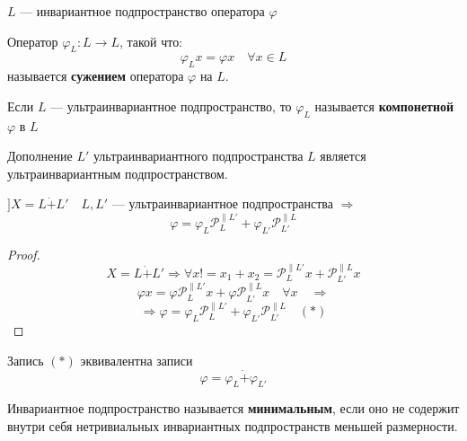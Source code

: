 $L$ --- инвариантное подпространство оператора $\varphi$

\begin{definition}
    Оператор $\varphi_L : L\to L$, такой что:
    $$\varphi_L x =\varphi x \quad \forall x\in L$$
    называется \textbf{сужением} оператора $\varphi$ на $L$.

    Если $L$ --- ультраинвариантное подпространство, то $\varphi_L$ называется \textbf{компонетной} $\varphi$ в $L$ 
\end{definition}

\begin{lemma}
    Дополнение $L'$ ультраинвариантного подпространства $L$ является ультраинвариантным подпространством.
\end{lemma}
\begin{lemma}
    $] X = L \dot+ L' \quad L,L'$ --- ультраинвариантное подпространства $\Rightarrow$
    $$\varphi = \varphi_L \mathcal P_L^{\parallel L'} + \varphi_{L'} \mathcal P_{L'}^{\parallel L}$$
\end{lemma}
\begin{proof}
    $$X = L \dot+ L' \Rightarrow \forall x! = x_1+x_2 = \mathcal P_L^{\parallel L'} x + \mathcal P_{L'}^{\parallel L} x$$
    $$\varphi x = \varphi \mathcal P_L^{\parallel L'} x + \varphi \mathcal P_{L'}^{\parallel L} x \quad \forall x \quad \Rightarrow$$
    $$\Rightarrow \varphi=\varphi_L \mathcal P_L^{\parallel L'} + \varphi_{L'} \mathcal P_{L'}^{\parallel L} \quad (*)$$
\end{proof}

\begin{remark}
    Запись $(*)$ эквивалентна записи
    $$\varphi = \varphi_L \dot+ \varphi_{L'}$$
\end{remark}

\begin{definition}
    Инвариантное подпространство называется \textbf{минимальным}, если оно не содержит внутри себя нетривиальных инвариантных подпространств меньшей размерности.
\end{definition}

